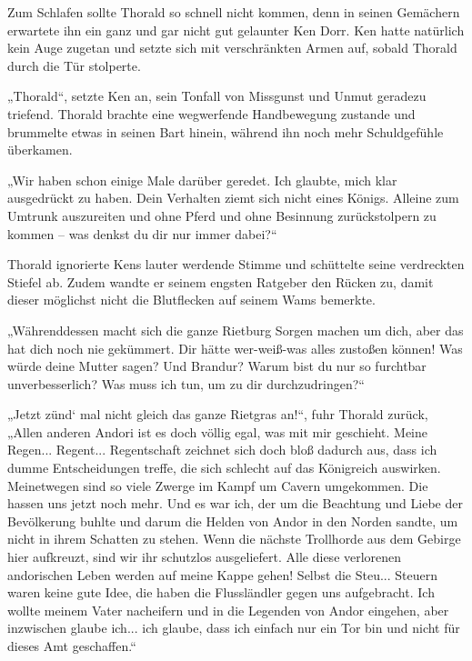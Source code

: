 \trennzeichen



Zum Schlafen sollte Thorald so schnell nicht kommen, denn in seinen Gemächern erwartete ihn ein ganz und gar nicht gut gelaunter Ken Dorr. Ken hatte natürlich kein Auge zugetan und setzte sich mit verschränkten Armen auf, sobald Thorald durch die Tür stolperte.

„Thorald“, setzte Ken an, sein Tonfall von Missgunst und Unmut geradezu triefend. Thorald brachte eine wegwerfende Handbewegung zustande und brummelte etwas in seinen Bart hinein, während ihn noch mehr Schuldgefühle überkamen.

„Wir haben schon einige Male darüber geredet. Ich glaubte, mich klar ausgedrückt zu haben. Dein Verhalten ziemt sich nicht eines Königs. Alleine zum Umtrunk auszureiten und ohne Pferd und ohne Besinnung zurückstolpern zu kommen – was denkst du dir nur immer dabei?“

Thorald ignorierte Kens lauter werdende Stimme und schüttelte seine verdreckten Stiefel ab. Zudem wandte er seinem engsten Ratgeber den Rücken zu, damit dieser möglichst nicht die Blutflecken auf seinem Wams bemerkte.

„Währenddessen macht sich die ganze Rietburg Sorgen machen um dich, aber das hat dich noch nie gekümmert. Dir hätte wer-weiß-was alles zustoßen können! Was würde deine Mutter sagen? Und Brandur? Warum bist du nur so furchtbar unverbesserlich? Was muss ich tun, um zu dir durchzudringen?“

„Jetzt zünd‘ mal nicht gleich das ganze Rietgras an!“, fuhr Thorald zurück, „Allen anderen Andori ist es doch völlig egal, was mit mir geschieht. Meine Regen... Regent... Regentschaft zeichnet sich doch bloß dadurch aus, dass ich dumme Entscheidungen treffe, die sich schlecht auf das Königreich auswirken. Meinetwegen sind so viele Zwerge im Kampf um Cavern umgekommen. Die hassen uns jetzt noch mehr. Und es war ich, der um die Beachtung und Liebe der Bevölkerung buhlte und darum die Helden von Andor in den Norden sandte, um nicht in ihrem Schatten zu stehen. Wenn die nächste Trollhorde aus dem Gebirge hier aufkreuzt, sind wir ihr schutzlos ausgeliefert. Alle diese verlorenen andorischen Leben werden auf meine Kappe gehen! Selbst die Steu... Steuern waren keine gute Idee, die haben die Flussländler gegen uns aufgebracht. Ich wollte meinem Vater nacheifern und in die Legenden von Andor eingehen, aber inzwischen glaube ich... ich glaube, dass ich einfach nur ein Tor bin und nicht für dieses Amt geschaffen.“

